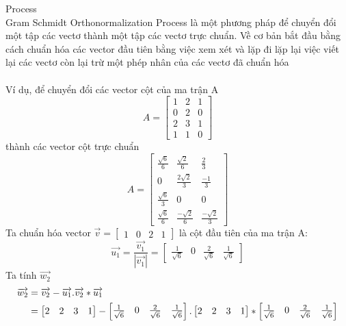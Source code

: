 \begin{itemize}
  Process\\
  Gram Schmidt Orthonormalization Process là một phương pháp để chuyển đổi một
  tập các vectơ thành một tập các vectơ trực chuẩn. Về cơ bản bắt đầu bằng cách
  chuẩn hóa các vector đầu tiên bằng việc xem xét và lặp đi lặp lại việc viết
  lại các vectơ còn lại trừ một phép nhân của các vectơ đã chuẩn hóa\\\\
  Ví dụ, để chuyển đổi các vector cột của ma trận A 
  \[A = 
  \begin{bmatrix} 
    1 & 2 & 1\\
    0 & 2 & 0\\
    2 & 3 & 1\\
    1 & 1 & 0
   \end{bmatrix} \]
   thành các vector cột trực chuẩn
   \[A = 
  \begin{bmatrix} 
    \frac{\sqrt{6}}{6} & \frac{\sqrt{2}}{6} & \frac{2}{3}\\
    0 & \frac{2\sqrt{2}}{3} & \frac{-1}{3}\\
    \frac{\sqrt{6}}{3} & 0 & 0\\
    \frac{\sqrt{6}}{6} & \frac{-\sqrt{2}}{6} & \frac{-\sqrt{2}}{3}
   \end{bmatrix} \]
   Ta chuẩn hóa vector $\overrightarrow{v} = \begin{bmatrix} 1 & 0 & 2 & 1
   \end{bmatrix}$ là cột đầu tiên của ma trận A:
   \[ \overrightarrow{u_1}  =
   \frac{\overrightarrow{v_1}}{|\overrightarrow{v_1}|} = 
   \begin{bmatrix} \frac{1}{\sqrt{6}} & 0 & \frac{2}{\sqrt{6}} & \frac{1}{\sqrt{6}}
   \end{bmatrix}
   \]
   Ta tính $\overrightarrow{w_2}$
    \begin{align} \overrightarrow{w_2} & = \overrightarrow{v_2} -
    \overrightarrow{u_1}.\overrightarrow{v_2} * \overrightarrow{u_1} \notag\\ &= 
     \begin{bmatrix} 2 & 2 & 3 & 1 \end{bmatrix} - 
   \begin{bmatrix} \frac{1}{\sqrt{6}} & 0 & \frac{2}{\sqrt{6}} & \frac{1}{\sqrt{6}}
   \end{bmatrix} . 
    \begin{bmatrix} 2 & 2 & 3 & 1 \end{bmatrix} *
    \begin{bmatrix} \frac{1}{\sqrt{6}} & 0 & \frac{2}{\sqrt{6}} & \frac{1}{\sqrt{6}}

\end{bmatrix}
\end{align}
\end{itemize}
